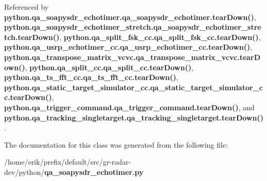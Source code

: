 Referenced by {\bf python.\+qa\+\_\+soapysdr\+\_\+echotimer.\+qa\+\_\+soapysdr\+\_\+echotimer.\+tear\+Down()}, {\bf python.\+qa\+\_\+soapysdr\+\_\+echotimer\+\_\+stretch.\+qa\+\_\+soapysdr\+\_\+echotimer\+\_\+stretch.\+tear\+Down()}, {\bf python.\+qa\+\_\+split\+\_\+fsk\+\_\+cc.\+qa\+\_\+split\+\_\+fsk\+\_\+cc.\+tear\+Down()}, {\bf python.\+qa\+\_\+usrp\+\_\+echotimer\+\_\+cc.\+qa\+\_\+usrp\+\_\+echotimer\+\_\+cc.\+tear\+Down()}, {\bf python.\+qa\+\_\+transpose\+\_\+matrix\+\_\+vcvc.\+qa\+\_\+transpose\+\_\+matrix\+\_\+vcvc.\+tear\+Down()}, {\bf python.\+qa\+\_\+split\+\_\+cc.\+qa\+\_\+split\+\_\+cc.\+tear\+Down()}, {\bf python.\+qa\+\_\+ts\+\_\+fft\+\_\+cc.\+qa\+\_\+ts\+\_\+fft\+\_\+cc.\+tear\+Down()}, {\bf python.\+qa\+\_\+static\+\_\+target\+\_\+simulator\+\_\+cc.\+qa\+\_\+static\+\_\+target\+\_\+simulator\+\_\+cc.\+tear\+Down()}, {\bf python.\+qa\+\_\+trigger\+\_\+command.\+qa\+\_\+trigger\+\_\+command.\+tear\+Down()}, and {\bf python.\+qa\+\_\+tracking\+\_\+singletarget.\+qa\+\_\+tracking\+\_\+singletarget.\+tear\+Down()}.



The documentation for this class was generated from the following file\+:\begin{DoxyCompactItemize}
\item 
/home/erik/prefix/default/src/gr-\/radar-\/dev/python/{\bf qa\+\_\+soapysdr\+\_\+echotimer.\+py}\end{DoxyCompactItemize}
